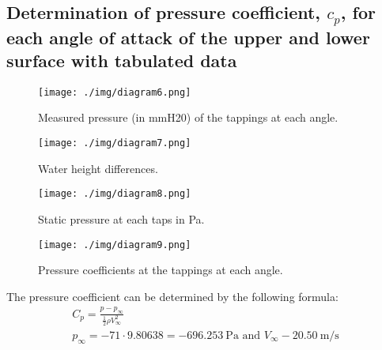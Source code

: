 \subsection{Determination of pressure coefficient, $c_p$, for each angle of attack of the upper and lower surface with tabulated data}
\begin{figure}[H]
    \centering
    \texttt{[image: ./img/diagram6.png]}
    \caption{Measured pressure (in mmH20) of the tappings at each angle.}
\end{figure}
\begin{figure}[H]
    \centering
    \texttt{[image: ./img/diagram7.png]}
    \caption{Water height differences.}
\end{figure}
\begin{figure}[H]
    \centering
    \texttt{[image: ./img/diagram8.png]}
    \caption{Static pressure at each taps in \si{\pascal}.}
    \label{staticpressure}
\end{figure}
\begin{figure}[H]
    \centering
    \texttt{[image: ./img/diagram9.png]}
    \caption{Pressure coefficients at the tappings at each angle.}
\end{figure}
The pressure coefficient can be determined by the following formula:
\begin{gather}
    C_p = \frac{p - p_{\infty}}{\frac{1}{2}\rho V_{\infty}^2}\\
    p_{\infty} = -71\cdot 9.80638 = \SI{-696.253}{\pascal} \textrm{ and } V_{\infty} - \SI{20.50}{\meter\per\second}
\end{gather}
